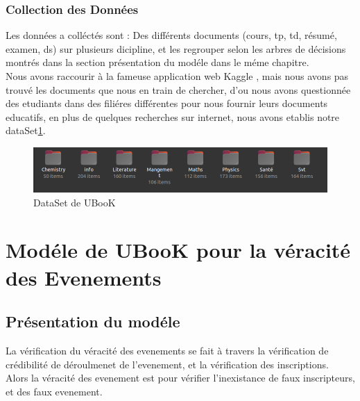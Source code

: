 \documentclass[12pt]{report}
\begin{document}
\subsection{Collection des Données}

Les données a colléctés sont : Des différents documents (cours, tp, td, résumé, examen, ds) sur plusieurs dicipline, et les regrouper selon les arbres de décisions montrés dans la section présentation du modéle dans le méme chapitre. \\
Nous avons raccourir à la fameuse application web Kaggle \cite{61} , mais nous avons pas trouvé les documents que nous en train de chercher, d'ou nous avons questionnée des etudiants dans des filiéres différentes pour nous fournir leurs documents educatifs, en plus de quelques recherches sur internet, nous avons etablis notre dataSet\ref{aaa :a aa}.

\begin{figure}[!hbtp]
    \centering
    \includegraphics[width=1\textwidth]{dataset2}
    \caption{DataSet de UBooK }
    \label{aaa :a aa}
\end{figure}



\newpage
\chapter{Modéle de UBooK pour la véracité des Evenements}
\section{Présentation du modéle}
La vérification du véracité des evenements se fait à travers la vérification de crédibilité de déroulmenet de l'evenement, et la vérification des inscriptions. \\
Alors la véracité des evenement est pour vérifier l'inexistance de faux inscripteurs, et des faux evenement.\\
\end{document}
